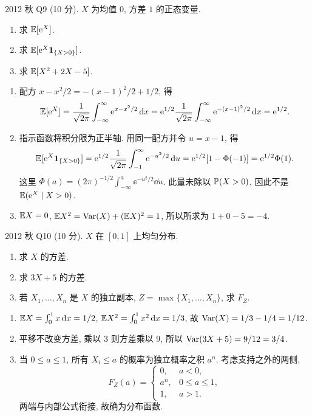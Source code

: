 \begin{exercise}\label{ex:fe2012q9}
2012 秋 Q9 (10 分). $X$ 为均值 $0$, 方差 $1$ 的正态变量.
\begin{enumerate}[label=(\alph*)]
\item\label{ex:fe2012q9-a} 求 $\mathbb E[\mathrm e^X]$.
\item\label{ex:fe2012q9-b} 求 $\mathbb E[\mathrm e^X\mathbf 1_{\{X>0\}}]$.
\item\label{ex:fe2012q9-c} 求 $\mathbb E[X^2+2X-5]$.
\end{enumerate}
\end{exercise}
\begin{solution}
\begin{enumerate}[label=(\alph*)]
\item\label{sol:fe2012q9-a} 配方 $x-x^2/2=-(x-1)^2/2+1/2$, 得
\[
 \mathbb E[\mathrm e^X]=\frac1{\sqrt{2\pi}}\int_{-\infty}^{\infty}\mathrm e^{x-x^2/2}\,\mathrm d x
 =\mathrm e^{1/2}\frac1{\sqrt{2\pi}}\int_{-\infty}^{\infty}\mathrm e^{-(x-1)^2/2}\,\mathrm d x=\mathrm e^{1/2}.
\]
\item\label{sol:fe2012q9-b} 指示函数将积分限为正半轴. 用同一配方并令 $u=x-1$, 得
\[
 \mathbb E[\mathrm e^X\mathbf 1_{\{X>0\}}]
 =\mathrm e^{1/2}\frac1{\sqrt{2\pi}}\int_{-1}^{\infty}\mathrm e^{-u^2/2}\,\mathrm d u
 =\mathrm e^{1/2}[1-\Phi(-1)]=\mathrm e^{1/2}\Phi(1).
\]
这里 $\Phi(a)=(2\pi)^{-1/2}\int_{-\infty}^a\ee^{-u^2/2}\dd u$. 此量未除以 $\mathbb P(X>0)$, 因此不是 $\mathbb E(\mathrm e^X\mid X>0)$.
\item\label{sol:fe2012q9-c} $\mathbb E X=0$, $\mathbb E X^2=\operatorname{Var}(X)+(\mathbb E X)^2=1$, 所以所求为 $1+0-5=-4$.
\end{enumerate}
\end{solution}

\begin{exercise}\label{ex:fe2012q10}
2012 秋 Q10 (10 分). $X$ 在 $[0,1]$ 上均匀分布.
\begin{enumerate}[label=(\alph*)]
\item\label{ex:fe2012q10-a} 求 $X$ 的方差.
\item\label{ex:fe2012q10-b} 求 $3X+5$ 的方差.
\item\label{ex:fe2012q10-c} 若 $X_1,\ldots,X_n$ 是 $X$ 的独立副本, $Z=\max\{X_1,\ldots,X_n\}$, 求 $F_Z$.
\end{enumerate}
\end{exercise}
\begin{solution}
\begin{enumerate}[label=(\alph*)]
\item\label{sol:fe2012q10-a} $\mathbb E X=\int_0^1x\,\mathrm d x=1/2$, $\mathbb E X^2=\int_0^1x^2\,\mathrm d x=1/3$, 故 $\operatorname{Var}(X)=1/3-1/4=1/12$.
\item\label{sol:fe2012q10-b} 平移不改变方差, 乘以 $3$ 则方差乘以 $9$, 所以 $\operatorname{Var}(3X+5)=9/12=3/4$.
\item\label{sol:fe2012q10-c} 当 $0\le a\le1$, 所有 $X_i\le a$ 的概率为独立概率之积 $a^n$. 考虑支持之外的两侧,
\[
 F_Z(a)=\begin{cases}0,&a<0,\\a^n,&0\le a\le1,\\1,&a>1.\end{cases}
\]
两端与内部公式衔接, 故确为分布函数.
\end{enumerate}
\end{solution}

